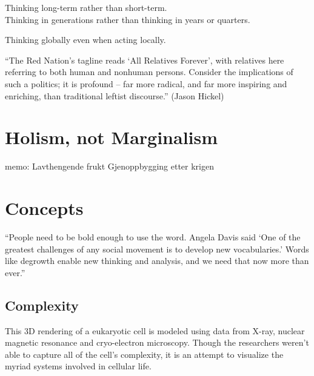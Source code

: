 \documentclass[
]{book}
\begin{document}
Thinking long-term rather than short-term.\\
Thinking in generations rather than thinking in years or quarters.

Thinking globally even when acting locally.

``The Red Nation's tagline reads `All Relatives Forever', with relatives here referring to both human and nonhuman persons. Consider the implications of such a politics; it is profound -- far more radical, and far more inspiring and enriching, than traditional leftist discourse.'' (Jason Hickel)

\hypertarget{holism-not-marginalism}{%
\chapter{Holism, not Marginalism}\label{holism-not-marginalism}}

memo: Lavthengende frukt Gjenoppbygging etter krigen

\hypertarget{concepts}{%
\chapter{Concepts}\label{concepts}}

``People need to be bold enough to use the word. Angela Davis said `One of the greatest challenges of any social movement is to develop new vocabularies.' Words like degrowth enable new thinking and analysis, and we need that now more than ever.''

\hypertarget{complexity}{%
\section{Complexity}\label{complexity}}

This 3D rendering of a eukaryotic cell is modeled using data from X-ray, nuclear magnetic resonance and cryo-electron microscopy. Though the researchers weren't able to capture all of the cell's complexity, it is an attempt to visualize the myriad systems involved in cellular life.
\end{document}
